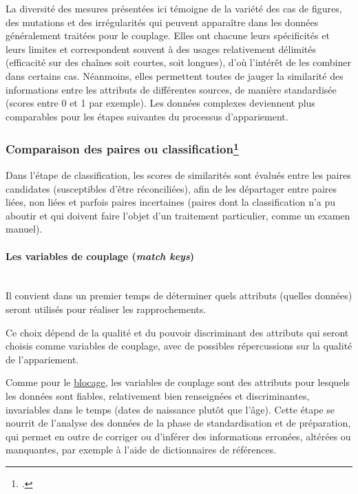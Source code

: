 \documentclass[a4paper,12pt,twoside]{book}
\begin{document}
                La diversité des mesures présentées ici témoigne de la variété des cas de figures, des mutations et des irrégularités qui peuvent apparaître dans les données généralement traitées pour le couplage.
                Elles ont chacune leurs spécificités et leurs limites et correspondent souvent à des usages relativement délimités (efficacité sur des chaînes soit courtes, soit longues), d'où l'intérêt de les combiner dans certains cas.
                Néanmoins, elles permettent toutes de jauger la similarité des informations entre les attributs de différentes sources, de manière standardisée (scores entre 0 et 1 par exemple). Les données complexes deviennent plus comparables pour les étapes suivantes du processus d'appariement.
                
			    \subsubsection[Comparaison des paires ou \og{}classification\fg{}]{Comparaison des paires ou \og{}classification\fg{}\footcite[Voir~:][pp.~129-162]{christenDataMatchingConcepts2012}}
			    \label{compare}
			    Dans l'étape de classification, les scores de similarités sont évalués entre les paires candidates (susceptibles d'être réconciliées), afin de les départager entre paires liées, non liées et parfois paires incertaines (paires dont la classification n'a pu aboutir et qui doivent faire l'objet d'un traitement particulier, comme un examen manuel).
			    
			    \paragraph{Les variables de couplage (\textit{match keys})}\mbox{} \\
			    
			    Il convient dans un premier temps de déterminer quels attributs (quelles données) seront utilisés pour réaliser les rapprochements.
			    
			    Ce choix dépend de la qualité et du pouvoir discriminant des attributs qui seront choisis comme variables de couplage, avec de possibles répercussions sur la qualité de l'appariement.
			    
			    Comme pour le \hyperref[blocking]{blocage}, les variables de couplage sont des attributs pour lesquels les données sont fiables, relativement bien renseignées et discriminantes, invariables dans le temps (dates de naissance plutôt que l'âge).
			    Cette étape se nourrit de l'analyse des données de la phase de standardisation et de préparation, qui permet en outre de corriger ou d'inférer des informations erronées, altérées ou manquantes, par exemple à l'aide de dictionnaires de références.
\end{document}
